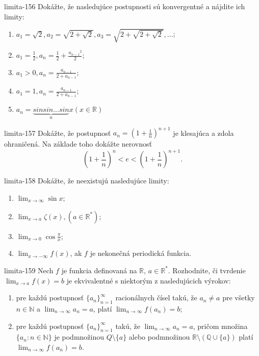 \begin{defproblem}{limita-156}
Dokážte, že nasledujúce postupnosti sú konvergentné a nájdite ich limity:
\begin{enumerate}
\item $a_1=\sqrt{2}, a_2=\sqrt{2+\sqrt{2}}, a_3=\sqrt{2+\sqrt{2+\sqrt{2}}},...$;
\item $a_1=\frac{1}{2}, a_n=\frac{1}{2}+\frac{{a_{n-1}}^{2}}{2}$;
\item $a_1>0, a_n=\frac{a_{n-1}}{2+a_{n-1}}$;
\item $a_1=1, a_n=\frac{a_{n-1}}{2+a_{n-1}}$;
\item $a_n=\underbrace{sin sin ... sin}_n x (x \in \mathbb{R})$
\end{enumerate}
\end{defproblem}

\begin{defproblem}{limita-157}
Dokážte, že postupnosť $a_{n}=(1+\frac{1}{n})^{n+1}$ je klesajúca a zdola ohraničená. Na základe toho dokážte nerovnosť
$$(1+\frac{1}{n})^n<e<(1+\frac{1}{n})^{n+1}.$$
\end{defproblem}

\begin{defproblem}{limita-158}
Dokážte, že neexistujú nasledujúce limity:
\begin{multicols}{2}
\begin{enumerate}
    \item $\lim_{{x \rightarrow \infty}} \sin x$;
    \item $\lim_{{x \rightarrow a}} \zeta (x), (a \in \mathbb{R^*})$;
    \item $\lim_{{x \rightarrow 0}} \cos \frac{\pi}{x}$;
    \item $\lim_{{x \rightarrow -\infty}} f(x)$, ak $f$ je nekonečná periodická funkcia.
\end{enumerate}
\end{multicols}
\end{defproblem}

\begin{defproblem}{limita-159}
Nech $f$ je funkcia definovaná na $\mathbb{R}$, $a \in \mathbb{R^*}$. Rozhodnite, či tvrdenie $\lim_{x \rightarrow a} f(x)=b$ je ekvivalentné s niektorým z nasledujúcich výrokov:
\begin{enumerate}
\item pre každú postupnosť ${\{a_n\}}_{n=1}^\infty$ racionálnych čísel takú, že $a_n \neq a$ pre všetky $n \in \mathbb{N}$ a $\lim_{n \rightarrow \infty} a_n=a$, platí $\lim_{n \rightarrow \infty} f(a_n)=b$;
\item pre každú postupnosť ${\{a_n\}}_{n=1}^\infty$ takú, že $\lim_{n \rightarrow \infty} a_n=a$, pričom množina $\{ a_n : n\in \mathbb{N }\}$ je podmnožinou $Q \setminus \{ a\}$ alebo podmnožinou $\mathbb{R} \setminus (\mathbb{Q} \cup \{ a\})$ platí $\lim_{n \rightarrow \infty} f(a_n)=b$.
\end{enumerate}
\end{defproblem}

